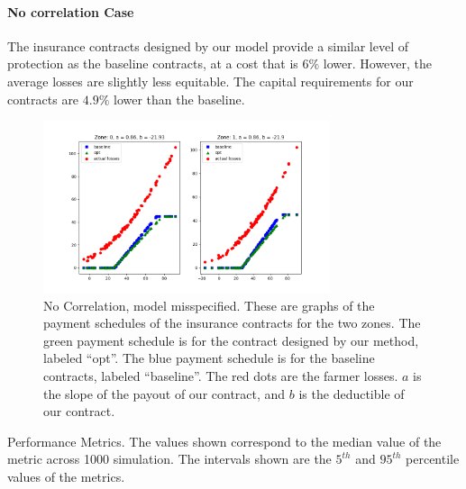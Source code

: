 \documentclass[11pt]{article}
\begin{document}
      \paragraph{No correlation Case} The insurance contracts designed by our model provide a similar level of protection as the baseline contracts, at a cost that is $6\%$ lower. However, the average losses are slightly less equitable. The capital requirements for our contracts are $4.9\%$ lower than the baseline. 
      \begin{figure}[H]
          \centering
          \includegraphics[width=0.75\textwidth]{../../output/figures/Bootstrap/no_corr_nonlinear.png}
          \caption{No Correlation, model misspecified. These are graphs of the payment schedules of the insurance contracts for the two zones. The green payment schedule is for the contract designed by our method, labeled ``opt''. The blue payment schedule is for the baseline contracts, labeled ``baseline''. The red dots are the farmer losses. $a$ is the slope of the payout of our contract, and $b$ is the deductible of our contract.}
      \end{figure}

      \begin{table}[H]
          \centering
          
          
          \caption{Performance Metrics. The values shown correspond to the median value of the metric across 1000 simulation. The intervals shown are the $5^{th}$ and $95^{th}$ percentile values of the metrics.}
      \end{table}
      \FloatBarrier
\end{document}
